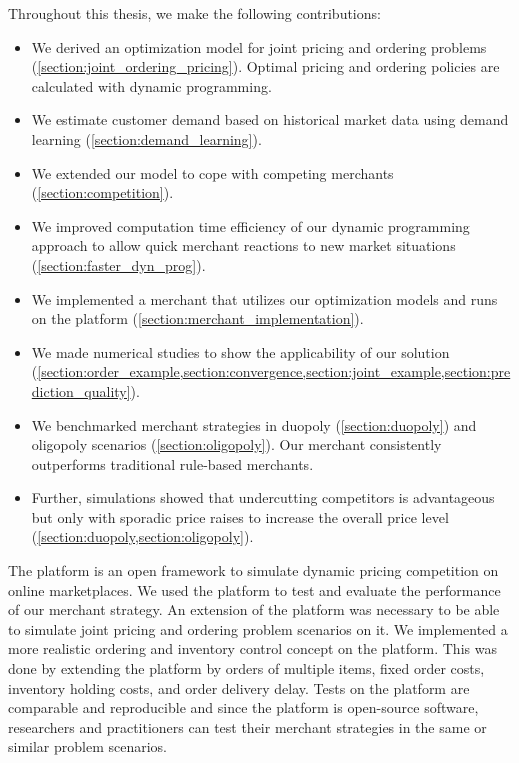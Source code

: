 Throughout this thesis, we make the following contributions:
\begin{itemize}
	\item We derived an optimization model for joint pricing and ordering problems (\cref{section:joint_ordering_pricing}). Optimal pricing and ordering policies are calculated with dynamic programming.
	\item We estimate customer demand based on historical market data using demand learning (\cref{section:demand_learning}).
	\item We extended our model to cope with competing merchants (\cref{section:competition}).
	\item We improved computation time efficiency of our dynamic programming approach to allow quick merchant reactions to new market situations (\cref{section:faster_dyn_prog}).
	\item We implemented a merchant that utilizes our optimization models and runs on the  \pricewars platform (\cref{section:merchant_implementation}).
	\item We made numerical studies to show the applicability of our solution (\cref{section:order_example,section:convergence,section:joint_example,section:prediction_quality}).
	\item We benchmarked merchant strategies in duopoly (\cref{section:duopoly}) and oligopoly scenarios (\cref{section:oligopoly}). Our merchant consistently outperforms traditional rule-based merchants.
	\item Further, simulations showed that undercutting competitors is advantageous but only with sporadic price raises to increase the overall price level (\cref{section:duopoly,section:oligopoly}).
\end{itemize}

The \pricewars platform is an open framework to simulate dynamic pricing competition on online marketplaces.
We used the platform to test and evaluate the performance of our merchant strategy.
An extension of the platform was necessary to be able to simulate joint pricing and ordering problem scenarios on it.
We implemented a more realistic ordering and inventory control concept on the \pricewars platform.
This was done by extending the platform by orders of multiple items, fixed order costs, inventory holding costs, and order delivery delay.
Tests on the platform are comparable and reproducible and since the platform is open-source software, researchers and practitioners can test their merchant strategies in the same or similar problem scenarios.




